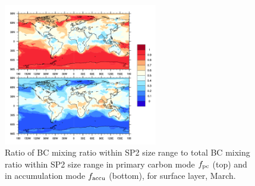 \documentclass[11pt]{article}
\begin{document}
	
	
	\begin{figure}[!h] 
		\begin{center}
			\includegraphics[width = 0.6\textwidth]{Rplot04}
			\caption[]{\label{fig_P7} Ratio of BC mixing ratio within SP2 size range to total BC mixing ratio within SP2 size range in primary carbon mode $f_{\rm pc}$ (top) and in accumulation mode $f_{\rm accu}$ (bottom), for surface layer, March.}
		\end{center}
	\end{figure}
	
	
	
	
	
	\clearpage
	
	
	
	
	
	
	
	
	
	
	
	
\end{document}
